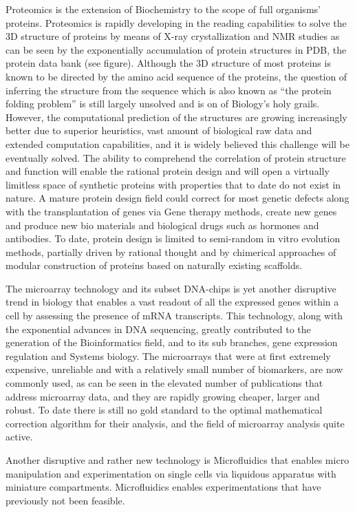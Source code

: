 \documentclass[letter,11pt]{article}
\begin{document}
Proteomics is the extension of Biochemistry to the scope of full organisms'
proteins.  Proteomics is rapidly developing in the reading capabilities to
solve the 3D structure of proteins by means of X-ray crystallization and NMR
studies as can be seen by the exponentially accumulation of protein structures
in PDB, the protein data bank (see figure). Although the 3D structure of most
proteins is known to be directed by the amino acid sequence of the proteins,
the question of inferring the structure from the sequence which is also known
as ``the protein folding problem'' is still largely unsolved and is on of
Biology's holy grails. However, the computational prediction of the structures
are growing increasingly better due to superior heuristics, vast amount of
biological raw data and extended computation capabilities, and it is widely
believed this challenge will be eventually solved. The ability to comprehend
the correlation of protein structure and function will enable the rational
protein design and will open a virtually limitless space of synthetic proteins
with properties that to date do not exist in nature. A mature protein design
field could correct for most genetic defects along with the transplantation of
genes via Gene therapy methods, create new genes and produce new bio materials
and biological drugs such as hormones and antibodies. To date, protein design
is limited to semi-random in vitro evolution methods, partially driven by
rational thought and by chimerical approaches of modular construction of
proteins based on naturally existing scaffolds.
 
The microarray technology and its subset DNA-chips is yet another disruptive
trend in biology that enables a vast readout of all the expressed genes within
a cell by assessing the presence of mRNA transcripts. This technology, along
with the exponential advances in DNA sequencing, greatly contributed to the
generation of the Bioinformatics field, and to its sub branches, gene
expression regulation and Systems biology. The microarrays that were at first
extremely expensive, unreliable and with a relatively small number of
biomarkers, are now commonly used, as can be seen in the elevated number of
publications that address microarray data, and they are rapidly growing
cheaper, larger and robust. To date there is still no gold standard to the
optimal mathematical correction algorithm for their analysis, and the field of
microarray analysis quite active.
 
Another disruptive and rather new technology is Microfluidics that enables
micro manipulation and experimentation on single cells via liquidous apparatus
with miniature compartments. Microfluidics enables experimentations that have
previously not been feasible.
 
\end{document}
